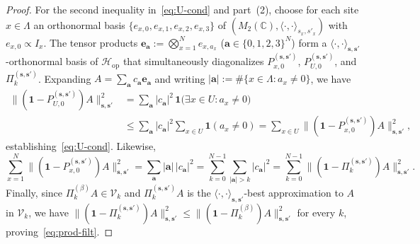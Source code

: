 \documentclass[11pt,a4paper]{article}
\numberwithin{equation}{section}
\theoremstyle{plain}
\theoremstyle{definition}
\newcommand{\Hop}{\mathcal{H}_{\mathrm{op}}}
\begin{document}
\begin{proof}
For the second inequality in~\eqref{eq:U-cond} and part~(2), choose for each site $x\in\Lambda$ an orthonormal basis $\{e_{x,0}, e_{x,1}, e_{x,2}, e_{x,3}\}$ of $(M_2(\mathbb{C}), \langle\cdot,\cdot\rangle_{s_x,s'_x})$ with $e_{x,0} \propto I_x$. The tensor products $\mathbf{e}_{\mathbf{a}} := \bigotimes_{x=1}^N e_{x,a_x}$ ($\mathbf{a}\in\{0,1,2,3\}^N$) form a $\langle\cdot,\cdot\rangle_{\mathbf{s},\mathbf{s}'}$-orthonormal basis of $\Hop$ that simultaneously diagonalizes $P_{x,0}^{(\mathbf{s},\mathbf{s}')}$, $P_{U,0}^{(\mathbf{s},\mathbf{s}')}$, and $\Pi_k^{(\mathbf{s},\mathbf{s}')}$. Expanding $A = \sum_{\mathbf{a}} c_{\mathbf{a}}\mathbf{e}_{\mathbf{a}}$ and writing $|\mathbf{a}| := \#\{x\in\Lambda : a_x\ne 0\}$, we have
\begin{align*}
  \bigl\|(\mathbf{1}-P_{U,0}^{(\mathbf{s},\mathbf{s}')})A\bigr\|_{\mathbf{s},\mathbf{s}'}^2
  &= \sum_{\mathbf{a}} |c_{\mathbf{a}}|^2\,\mathbf{1}\bigl(\exists x\in U : a_x\ne 0\bigr) \\
  &\le \sum_{\mathbf{a}} |c_{\mathbf{a}}|^2\sum_{x\in U}\mathbf{1}(a_x\ne 0)
   = \sum_{x\in U}\bigl\|(\mathbf{1}-P_{x,0}^{(\mathbf{s},\mathbf{s}')})A\bigr\|_{\mathbf{s},\mathbf{s}'}^2,
\end{align*}
establishing~\eqref{eq:U-cond}. Likewise,
\[
  \sum_{x=1}^N \bigl\|(\mathbf{1}-P_{x,0}^{(\mathbf{s},\mathbf{s}')})A\bigr\|_{\mathbf{s},\mathbf{s}'}^2
  = \sum_{\mathbf{a}} |\mathbf{a}|\,|c_{\mathbf{a}}|^2
  = \sum_{k=0}^{N-1}\sum_{|\mathbf{a}|>k}|c_{\mathbf{a}}|^2
  = \sum_{k=0}^{N-1}\bigl\|(\mathbf{1}-\Pi_k^{(\mathbf{s},\mathbf{s}')})A\bigr\|_{\mathbf{s},\mathbf{s}'}^2.
\]
Finally, since $\Pi_k^{(\beta)}A\in\mathcal{V}_k$ and $\Pi_k^{(\mathbf{s},\mathbf{s}')}A$ is the $\langle\cdot,\cdot\rangle_{\mathbf{s},\mathbf{s}'}$-best approximation to $A$ in $\mathcal{V}_k$, we have $\|(\mathbf{1}-\Pi_k^{(\mathbf{s},\mathbf{s}')})A\|_{\mathbf{s},\mathbf{s}'}^2 \le \|(\mathbf{1}-\Pi_k^{(\beta)})A\|_{\mathbf{s},\mathbf{s}'}^2$ for every $k$, proving~\eqref{eq:prod-filt}.
\end{proof}
\end{document}
